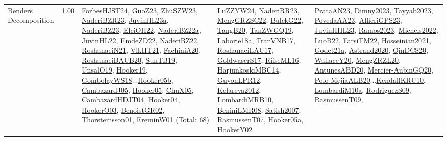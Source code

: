 {\begin{longtable}{p{3cm}r>{\raggedright\arraybackslash}p{6cm}>{\raggedright\arraybackslash}p{6cm}>{\raggedright\arraybackslash}p{8cm}}
\index{Benders Decomposition}\index{Concepts!Benders Decomposition}Benders Decomposition &  1.00 & \hyperref[detail:ForbesHJST24]{ForbesHJST24}, \hyperref[detail:GuoZ23]{GuoZ23}, \hyperref[detail:ZhuSZW23]{ZhuSZW23}, \hyperref[detail:NaderiBZR23]{NaderiBZR23}, \hyperref[detail:JuvinHL23a]{JuvinHL23a}, \hyperref[detail:NaderiBZ23]{NaderiBZ23}, \hyperref[detail:ElciOH22]{ElciOH22}, \hyperref[detail:NaderiBZ22a]{NaderiBZ22a}, \hyperref[detail:JuvinHL22]{JuvinHL22}, \hyperref[detail:EmdeZD22]{EmdeZD22}, \hyperref[detail:NaderiBZ22]{NaderiBZ22}, \hyperref[detail:RoshanaeiN21]{RoshanaeiN21}, \hyperref[detail:VlkHT21]{VlkHT21}, \hyperref[detail:FachiniA20]{FachiniA20}, \hyperref[detail:RoshanaeiBAUB20]{RoshanaeiBAUB20}, \hyperref[detail:SunTB19]{SunTB19}, \hyperref[detail:UnsalO19]{UnsalO19}, \hyperref[detail:Hooker19]{Hooker19}, \hyperref[detail:GombolayWS18]{GombolayWS18}...\hyperref[detail:Hooker05b]{Hooker05b}, \hyperref[detail:CambazardJ05]{CambazardJ05}, \hyperref[detail:Hooker05]{Hooker05}, \hyperref[detail:ChuX05]{ChuX05}, \hyperref[detail:CambazardHDJT04]{CambazardHDJT04}, \hyperref[detail:Hooker04]{Hooker04}, \hyperref[detail:HookerO03]{HookerO03}, \hyperref[detail:BenoistGR02]{BenoistGR02}, \hyperref[detail:Thorsteinsson01]{Thorsteinsson01}, \hyperref[detail:EreminW01]{EreminW01} (Total: 68) & \hyperref[detail:LuZZYW24]{LuZZYW24}, \hyperref[detail:NaderiRR23]{NaderiRR23}, \hyperref[detail:MengGRZSC22]{MengGRZSC22}, \hyperref[detail:BulckG22]{BulckG22}, \hyperref[detail:TangB20]{TangB20}, \hyperref[detail:TanZWGQ19]{TanZWGQ19}, \hyperref[detail:Laborie18a]{Laborie18a}, \hyperref[detail:TranVNB17]{TranVNB17}, \hyperref[detail:RoshanaeiLAU17]{RoshanaeiLAU17}, \hyperref[detail:GoldwaserS17]{GoldwaserS17}, \hyperref[detail:RiiseML16]{RiiseML16}, \hyperref[detail:HarjunkoskiMBC14]{HarjunkoskiMBC14}, \hyperref[detail:GuyonLPR12]{GuyonLPR12}, \hyperref[detail:Kelareva2012]{Kelareva2012}, \hyperref[detail:LombardiMRB10]{LombardiMRB10}, \hyperref[detail:BeniniLMR08]{BeniniLMR08}, \hyperref[detail:Satish2007]{Satish2007}, \hyperref[detail:RasmussenT07]{RasmussenT07}, \hyperref[detail:Hooker05a]{Hooker05a}, \hyperref[detail:HookerY02]{HookerY02} & \hyperref[detail:PrataAN23]{PrataAN23}, \hyperref[detail:Dimny2023]{Dimny2023}, \hyperref[detail:Tayyab2023]{Tayyab2023}, \hyperref[detail:PovedaAA23]{PovedaAA23}, \hyperref[detail:AlfieriGPS23]{AlfieriGPS23}, \hyperref[detail:JuvinHHL23]{JuvinHHL23}, \hyperref[detail:Ramos2023]{Ramos2023}, \hyperref[detail:Michels2022]{Michels2022}, \hyperref[detail:LuoB22]{LuoB22}, \hyperref[detail:FarsiTM22]{FarsiTM22}, \hyperref[detail:Hosseinian2021]{Hosseinian2021}, \hyperref[detail:Godet21a]{Godet21a}, \hyperref[detail:Astrand2020]{Astrand2020}, \hyperref[detail:QinDCS20]{QinDCS20}, \hyperref[detail:WallaceY20]{WallaceY20}, \hyperref[detail:MengZRZL20]{MengZRZL20}, \hyperref[detail:AntunesABD20]{AntunesABD20}, \hyperref[detail:Mercier-AubinGQ20]{Mercier-AubinGQ20}, \hyperref[detail:Polo-MejiaALB20]{Polo-MejiaALB20}...\hyperref[detail:KendallKRU10]{KendallKRU10}, \hyperref[detail:LombardiM10a]{LombardiM10a}, \hyperref[detail:RodriguezS09]{RodriguezS09}, \hyperref[detail:RasmussenT09]{RasmussenT09}, 
\end{longtable}}
